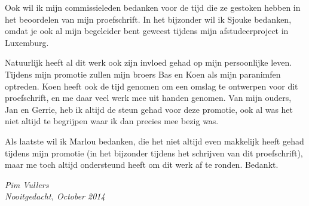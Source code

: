 Ook wil ik mijn commissieleden bedanken voor de tijd die ze gestoken hebben in 
het beoordelen van mijn proefschrift. In het bijzonder wil ik Sjouke bedanken, 
omdat je ook al mijn begeleider bent geweest tijdens mijn afstudeerproject in 
Luxemburg.

Natuurlijk heeft al dit werk ook zijn invloed gehad op mijn persoonlijke leven.
Tijdens mijn promotie zullen mijn broers Bas en Koen als mijn paranimfen 
optreden. Koen heeft ook de tijd genomen om een omslag te ontwerpen voor dit
proefschrift, en me daar veel werk mee uit handen genomen. Van mijn ouders,
Jan en Gerrie, heb ik altijd de steun gehad voor deze promotie, ook al was het
niet altijd te begrijpen waar ik dan precies mee bezig was. 

Als laatste wil ik Marlou bedanken, die het niet altijd even makkelijk heeft 
gehad tijdens mijn promotie (in het bijzonder tijdens het schrijven van dit 
proefschrift), maar me toch altijd ondersteund heeft om dit werk af te ronden. 
Bedankt.

\begin{flushright}
  \textit{Pim Vullers\\ Nooitgedacht, October 2014}
\end{flushright}
